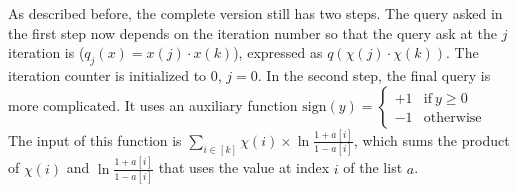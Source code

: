  
As described before, the complete version still has two steps. The query asked in the first step now depends on the iteration number so that the query ask at the $j$ iteration is ($q_j(x) = x(j)\cdot x(k)$), expressed as $q(\chi(j)\cdot \chi(k))$. The iteration counter is initialized to 0, $j = 0$. In the second step, the final query is more complicated. It uses an auxiliary function   $\mathrm{sign}(y)=\left \{ \begin{array}{lr} +1 & \mathrm{if}\ y\geq 0\\ -1 &\mathrm{otherwise} \end{array} \right . $ The input of this function is $\sum_{i\in [k]} \chi(i)\times\ln\frac{1+a[i]}{1-a[i]}$, which sums the product of $\chi(i)$ and $\ln\frac{1+a[i]}{1-a[i]}$ that uses the value at index $i$ of the list $a$.
